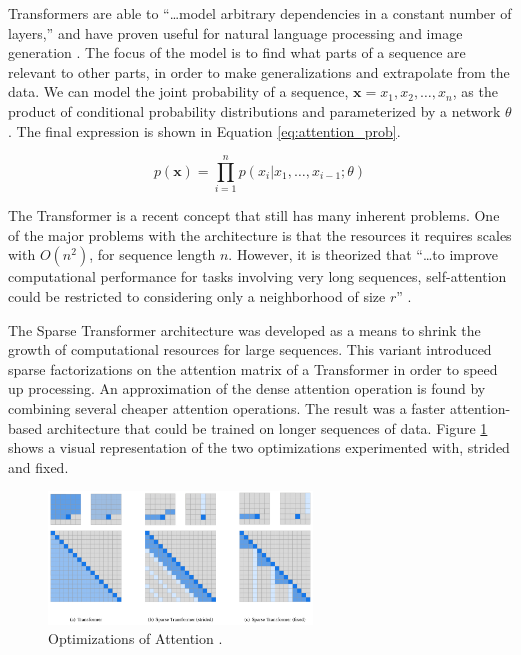 \documentclass[letterpaper]{article} %
\begin{document}
Transformers are able to
``\dots model arbitrary dependencies
in a constant number of layers,''
and have proven useful for natural language processing and image generation
\cite{generative_transformers}.
The focus of the model is to find what parts of a sequence are relevant to other parts,
in order to make generalizations and extrapolate from the data.
We can model the joint probability of a sequence,
$\mathbf{x}={x_1,x_2,\dots,x_n}$,
as the product of conditional
probability distributions and parameterized by a network $\theta$
\cite{generative_transformers}.
The final expression is shown in Equation \ref{eq:attention_prob}.

\begin{equation}
\label{eq:attention_prob}
p(\mathbf{x}) = \prod_{i=1}^{n}p(x_i|x_1,\dots,x_{i-1};\theta)
\end{equation}

The Transformer is a recent concept that still has many inherent problems.
One of the major problems with the architecture
is that the resources it requires scales with $O(n^2)$,
for sequence length $n$. However, it is theorized that
``\dots to improve computational performance for tasks involving very long sequences,
self-attention could be restricted to considering only a neighborhood of size $r$''
\cite{attention_need}.

The Sparse Transformer architecture was developed as a means to shrink the
growth of computational resources for large sequences.
This variant introduced sparse factorizations on the attention matrix
of a Transformer in order to speed up processing.
An approximation of the dense attention
operation is found by combining several cheaper attention operations.
The result was a faster attention-based architecture
that could be trained on longer sequences of data.
Figure \ref{fig:attention_optimization} shows a visual representation of
the two optimizations experimented with, strided and fixed.

\begin{figure}[htbp]
\centerline{\includegraphics[width=7cm]{attention_comparison.png}}
\caption{Optimizations of Attention
\cite{generative_transformers}.}
\label{fig:attention_optimization}
\end{figure}
\end{document}
